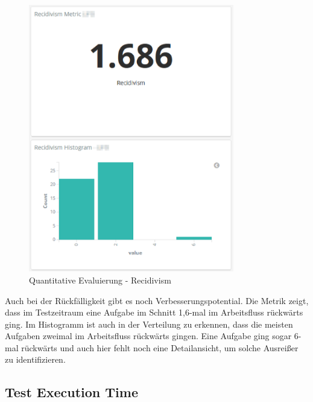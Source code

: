 \begin{savenotes}
    \begin{figure}[H]
      \centering
      \includegraphics[width=0.8\textwidth]{img/eval-recidivism.png}
      \caption{Quantitative Evaluierung {-} Recidivism}\label{fig:eval_recidivism}
    \end{figure}
\end{savenotes}

Auch bei der Rückfälligkeit gibt es noch Verbesserungspotential.
Die Metrik zeigt, dass im Testzeitraum eine Aufgabe im Schnitt 1,6-mal im Arbeitsfluss rückwärts ging.
Im Histogramm ist auch in der Verteilung zu erkennen, dass die meisten Aufgaben zweimal im Arbeitsfluss rückwärts gingen.
Eine Aufgabe ging sogar 6-mal rückwärts und auch hier fehlt noch eine Detailansicht, um solche Ausreißer zu identifizieren.

\clearpage
\subsection*{Test Execution Time}

